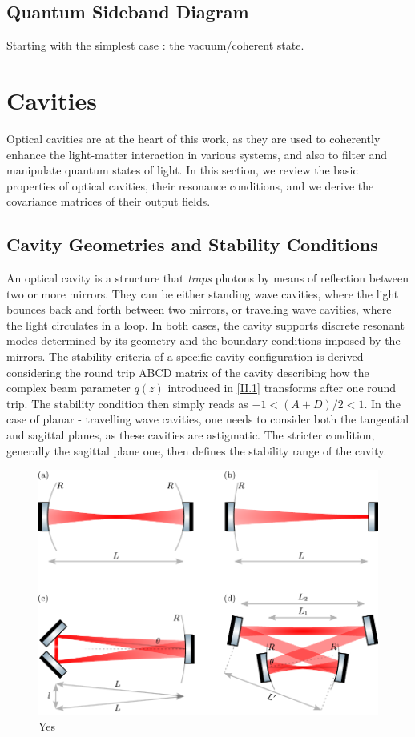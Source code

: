 \subsection{Quantum Sideband Diagram }

Starting with the simplest case : the vacuum/coherent state. 
\section{Cavities}
Optical cavities are at the heart of this work, as they are used to coherently enhance the light-matter interaction in various systems, and also to filter and manipulate quantum states of light. In this section, we review the basic properties of optical cavities, their resonance conditions, and we derive the covariance matrices of their output fields. 

\subsection{Cavity Geometries and Stability Conditions}
An optical cavity is a structure that \textit{traps} photons by means of reflection between two or more mirrors. They can be either standing wave cavities, where the light bounces back and forth between two mirrors, or traveling wave cavities, where the light circulates in a loop. In both cases, the cavity supports discrete resonant modes determined by its geometry and the boundary conditions imposed by the mirrors. The stability criteria of a specific cavity configuration is derived considering the round trip ABCD matrix of the cavity describing how the complex beam parameter $q(z)$ introduced in \eqref{II.1} transforms after one round trip. The stability condition then simply reads as $-1 < (A+D)/2 < 1$. In the case of planar - travelling wave cavities, one needs to consider both the tangential and sagittal planes, as these cavities are astigmatic. The stricter condition, generally the sagittal plane one, then defines the stability range of the cavity.\\

\begin{figure}
\centering
\includegraphics[width=\textwidth]{./chap2/fig/cavity_types.pdf}
\caption{Yes} 
\label{fig:cavity_types}
\end{figure}


